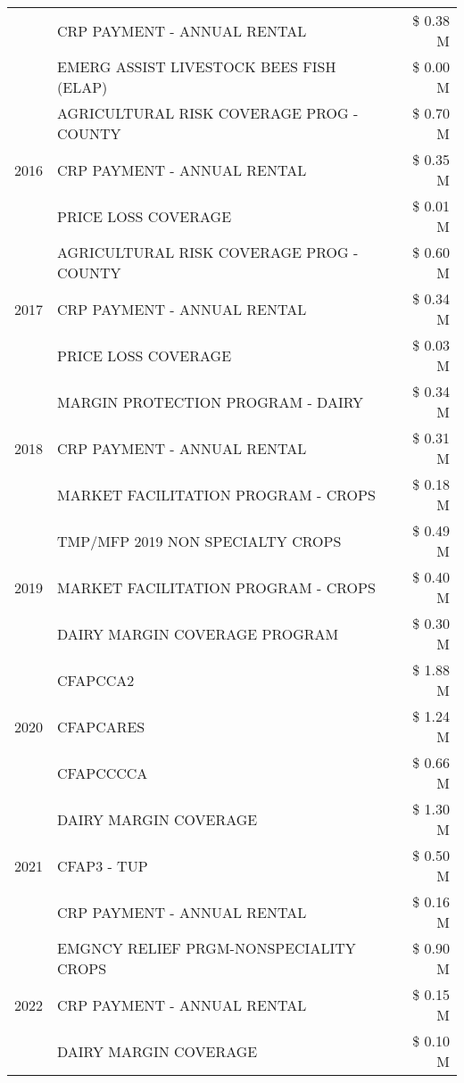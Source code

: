 \begin{tabular}{llr}
 & CRP PAYMENT - ANNUAL RENTAL & \$ 0.38 M \\
 & EMERG ASSIST LIVESTOCK BEES FISH (ELAP) & \$ 0.00 M \\
\cline{1-3}
\multirow[t]{3}{*}{2016} & AGRICULTURAL RISK COVERAGE PROG - COUNTY & \$ 0.70 M \\
 & CRP PAYMENT - ANNUAL RENTAL & \$ 0.35 M \\
 & PRICE LOSS COVERAGE & \$ 0.01 M \\
\cline{1-3}
\multirow[t]{3}{*}{2017} & AGRICULTURAL RISK COVERAGE PROG - COUNTY & \$ 0.60 M \\
 & CRP PAYMENT - ANNUAL RENTAL & \$ 0.34 M \\
 & PRICE LOSS COVERAGE & \$ 0.03 M \\
\cline{1-3}
\multirow[t]{3}{*}{2018} & MARGIN PROTECTION PROGRAM - DAIRY & \$ 0.34 M \\
 & CRP PAYMENT - ANNUAL RENTAL & \$ 0.31 M \\
 & MARKET FACILITATION PROGRAM - CROPS & \$ 0.18 M \\
\cline{1-3}
\multirow[t]{3}{*}{2019} & TMP/MFP 2019 NON SPECIALTY CROPS & \$ 0.49 M \\
 & MARKET FACILITATION PROGRAM - CROPS & \$ 0.40 M \\
 & DAIRY MARGIN COVERAGE PROGRAM & \$ 0.30 M \\
\cline{1-3}
\multirow[t]{3}{*}{2020} & CFAPCCA2 & \$ 1.88 M \\
 & CFAPCARES & \$ 1.24 M \\
 & CFAPCCCCA & \$ 0.66 M \\
\cline{1-3}
\multirow[t]{3}{*}{2021} & DAIRY MARGIN COVERAGE & \$ 1.30 M \\
 & CFAP3 - TUP & \$ 0.50 M \\
 & CRP PAYMENT - ANNUAL RENTAL & \$ 0.16 M \\
\cline{1-3}
\multirow[t]{3}{*}{2022} & EMGNCY RELIEF PRGM-NONSPECIALITY CROPS & \$ 0.90 M \\
 & CRP PAYMENT - ANNUAL RENTAL & \$ 0.15 M \\
 & DAIRY MARGIN COVERAGE & \$ 0.10 M \\
\cline{1-3}
\bottomrule
\end{tabular}
